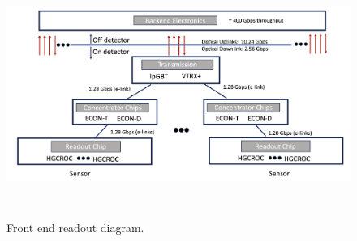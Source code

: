 \documentclass[twocolumn]{webofc}
\begin{document}
\begin{figure}[ht]
\centering
\includegraphics[height=8cm]{figures/ReadoutDiagram.png}
\caption{Front end readout diagram.}
\label{fig:diag}
\end{figure}
 
\end{document}
